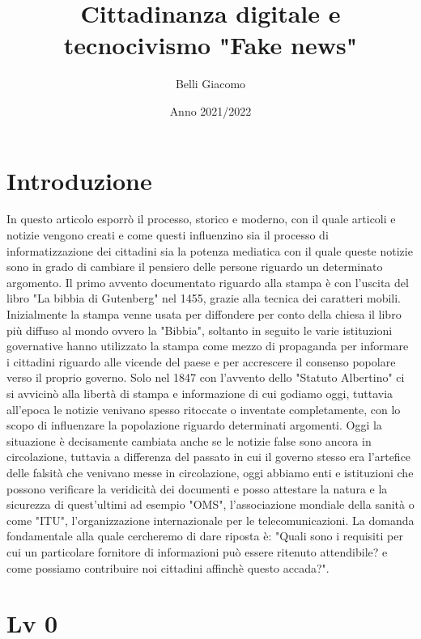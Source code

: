 \documentclass{article}
\title{Cittadinanza digitale e tecnocivismo "Fake news"}
\author{Belli Giacomo }
\date{Anno 2021/2022}
\begin{document}
\maketitle
\section{Introduzione}
In questo articolo esporrò il processo, storico e moderno, con il quale articoli e notizie vengono creati e come questi influenzino sia il processo di informatizzazione dei cittadini sia la potenza mediatica con il quale queste notizie sono in grado di cambiare il pensiero delle persone riguardo un determinato argomento.
Il primo avvento documentato riguardo alla stampa è con l'uscita del libro "La bibbia di Gutenberg" \cite{linzer2008gutenberg} nel 1455, grazie alla tecnica dei caratteri mobili.
Inizialmente la stampa venne usata per diffondere per conto della chiesa il libro più diffuso al mondo ovvero la "Bibbia", soltanto in seguito le varie istituzioni governative hanno utilizzato la stampa come mezzo di propaganda per informare i cittadini riguardo alle vicende del paese e per accrescere il consenso popolare verso il proprio governo.
Solo nel 1847 con l'avvento dello "Statuto Albertino" ci si avvicinò alla libertà di stampa e informazione di cui godiamo oggi, tuttavia all'epoca le notizie venivano spesso ritoccate o inventate completamente, con lo scopo di influenzare la popolazione riguardo determinati argomenti.
Oggi la situazione è decisamente cambiata anche se le notizie false sono ancora in circolazione, tuttavia a differenza del passato in cui il governo stesso era l'artefice delle falsità che venivano messe in circolazione, oggi abbiamo enti e istituzioni che possono verificare la veridicità dei documenti e posso attestare la natura e la sicurezza di quest'ultimi ad esempio "OMS", l'associazione mondiale della sanità o come "ITU", l'organizzazione internazionale per le telecomunicazioni.
La domanda fondamentale alla quale cercheremo di dare riposta è: "Quali sono i requisiti per cui un particolare fornitore di informazioni può essere ritenuto attendibile? e come possiamo contribuire noi cittadini affinchè questo accada?".
\section{Lv 0}
\end{document}

